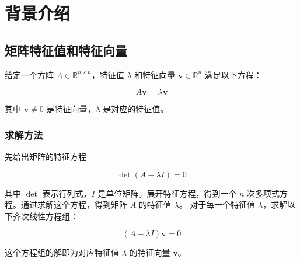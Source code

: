 \chapter{背景介绍}\label{chap:background}
\section{矩阵特征值和特征向量}
\begin{defn}[特征值和特征向量]
    给定一个方阵 \( A \in \mathbb{R}^{n \times n} \)，特征值 \( \lambda \) 和特征向量 \( \mathbf{v} \in \mathbb{R}^n \) 满足以下方程：

\[
A \mathbf{v} = \lambda \mathbf{v}
\]

其中 \( \mathbf{v} \neq 0 \) 是特征向量，\( \lambda \) 是对应的特征值。
\end{defn}


\subsection{求解方法}

先给出矩阵的特征方程

    \[
    \det(A - \lambda I) = 0
    \]

其中 \( \det \) 表示行列式，\( I \) 是单位矩阵。展开特征方程，得到一个 \( n \) 次多项式方程。通过求解这个方程，得到矩阵 \( A \) 的特征值 \( \lambda \)。 对于每一个特征值 \( \lambda \)，求解以下齐次线性方程组：

    \[
    (A - \lambda I) \mathbf{v} = 0
    \]

这个方程组的解即为对应特征值 \( \lambda \) 的特征向量 \( \mathbf{v} \)。

